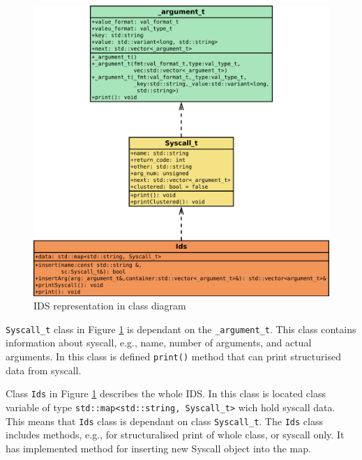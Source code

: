 \begin{figure}[h]
	\centering
	\includegraphics[width=\linewidth]{obrazky-figures/class/arg_sc.pdf}
	\caption{IDS representation in class diagram}
	\label{fig:class:ids}
\end{figure}
\pagebreak


\texttt{Syscall\_t} class in Figure \ref{fig:class:ids} is dependant  on the
\texttt{\_argument\_t}. This class contains information about syscall, e.g.,
name, number of arguments, and actual arguments. In this class is defined
\texttt{print()} method that can print structurised data from syscall.

Class \texttt{Ids} in Figure \ref{fig:class:ids} describes the whole IDS. In
this class is located class variable of type \texttt{std::map<std::string,
Syscall\_t>} wich hold syscall data. This means that \texttt{Ids} class is
dependant on class \texttt{Syscall\_t}. The \texttt{Ids} class includes methods,
e.g., for structuralised print of whole class, or syscall only. It has
implemented method for inserting new Syscall object into the map.

